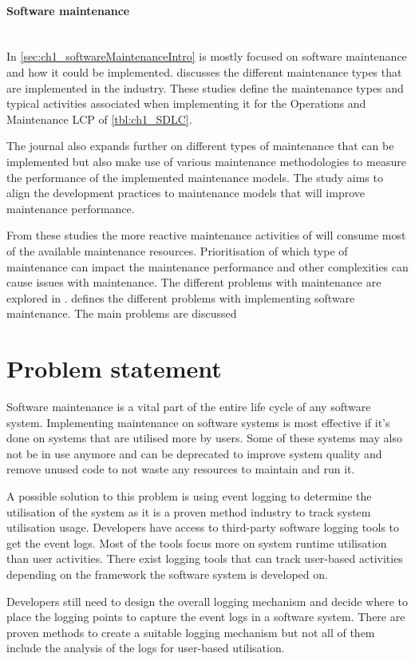 \paragraph{Software maintenance} \leavevmode\\
In \ref{sec:ch1_softwareMaintenanceIntro} is mostly focused on software maintenance and how it could be implemented. \cite{Hasan2012,Ping2010} discusses the different maintenance types that are implemented in the industry. These studies define the maintenance types and typical activities associated when implementing it for the Operations and Maintenance LCP of \ref{tbl:ch1_SDLC}.\par The \cite{Kumar2013} journal also expands further on different types of maintenance that can be implemented but also make use of various maintenance methodologies to measure the performance of the implemented maintenance models. The study aims to align the development practices to maintenance models that will improve maintenance performance. \par From these studies \cite{Hasan2012,Ping2010,Kumar2013} the more reactive maintenance activities of  will consume most of the available maintenance resources. Prioritisation of which type of maintenance can impact the maintenance performance and other complexities can cause issues with maintenance. The different problems with maintenance are explored in . \cite{Ogheneovo2014,Sneed2004} defines the different problems with implementing software maintenance. The main problems are discussed  

\section{Problem statement}\label{sec:ch1_problemStatement}
Software maintenance is a vital part of the entire life cycle of any software system. Implementing maintenance on software systems is most effective if it's done on systems that are utilised more by users. Some of these systems may also not be in use anymore and can be deprecated to improve system quality and remove unused code to not waste any resources to maintain and run it.\par A possible solution to this problem is using event logging to determine the utilisation of the system as it is a proven method industry to track system utilisation usage. Developers have access to third-party software logging tools to get the event logs. Most of the tools focus more on system runtime utilisation than user activities. There exist logging tools that can track user-based activities depending on the framework the software system is developed on.\par Developers still need to design the overall logging mechanism and decide where to place the logging points to capture the event logs in a software system. There are proven methods to create a suitable logging mechanism but not all of them include the analysis of the logs for user-based utilisation.

